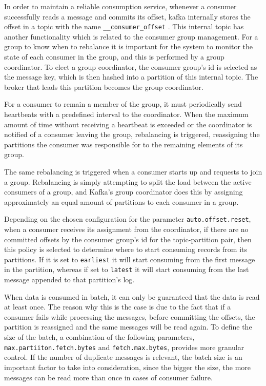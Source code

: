 In order to maintain a reliable consumption service, whenever a consumer
successfully reads a message and commits its offset, kafka internally stores the
offset in a topic with the name \lstinline{__consumer_offset}
\cite{KafkaConsumer}. This internal topic has another functionality which is
related to the consumer group management. For a group to know when to rebalance
it is important for the system to monitor the state of each consumer in the
group, and this is performed by a group coordinator. To elect a group
coordinator, the consumer group's id is selected as the message key, which is
then hashed into a partition of this internal topic. The broker that leads this
partition becomes the group coordinator.

For a consumer to remain a member of the group, it must periodically send
heartbeats with a predefined interval to the coordinator. When the maximum
amount of time without receiving a heartbeat is exceeded or the coordinator is
notified of a consumer leaving the group, rebalancing is triggered, reassigning
the partitions the consumer was responsible for to the remaining elements of its
group.

The same rebalancing is triggered when a consumer starts up and requests to join
a group. Rebalancing is simply attempting to split the load between the active
consumers of a group, and Kafka's group coordinator does this by assigning
approximately an equal amount of partitions to each consumer in a group. 

Depending on the chosen configuration for the parameter
\lstinline{auto.offset.reset}, when a consumer receives its assignment from the
coordinator, if there are no committed offsets by the consumer group's id for
the topic-partition pair, then this policy is selected to determine where to
start consuming records from its partitions. If it is set to \lstinline{earliest}
it will start consuming from the first message in the partition, whereas if set to
\lstinline{latest} it will start consuming from the last message appended to that
partition's log.

When data is consumed in batch, it can only be guaranteed that the data is read
at least once. The reason why this is the case is due to the fact that if a
consumer fails while processing the messages, before committing the offsets, the
partition is reassigned and the same messages will be read again. To define the
size of the batch, a combination of the following parameters,
\lstinline{max.partiiton.fetch.bytes} and \lstinline{fetch.max.bytes}, provides
more granular control. If the number of duplicate messages is relevant, the
batch size is an important factor to take into consideration, since the bigger
the size, the more messages can be read more than once in cases of consumer
failure.

